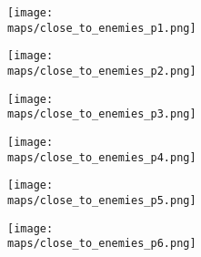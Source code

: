 \vspace{2em}

\begin{center}
  \begin{figure}[h!]
    \centering
    \texttt{[image: \\maps/close\_to\_enemies\_p1.png]}
  \end{figure}
  \begin{figure}[h!]
    \centering
    \texttt{[image: \\maps/close\_to\_enemies\_p2.png]}
  \end{figure}
  \begin{figure}[h!]
    \centering
    \texttt{[image: \\maps/close\_to\_enemies\_p3.png]}
  \end{figure}
  \begin{figure}[h!]
    \centering
    \texttt{[image: \\maps/close\_to\_enemies\_p4.png]}
  \end{figure}
  \begin{figure}[h!]
    \centering
    \texttt{[image: \\maps/close\_to\_enemies\_p5.png]}
  \end{figure}
  \begin{figure}[h!]
    \centering
    \texttt{[image: \\maps/close\_to\_enemies\_p6.png]}
  \end{figure}

\end{center}
